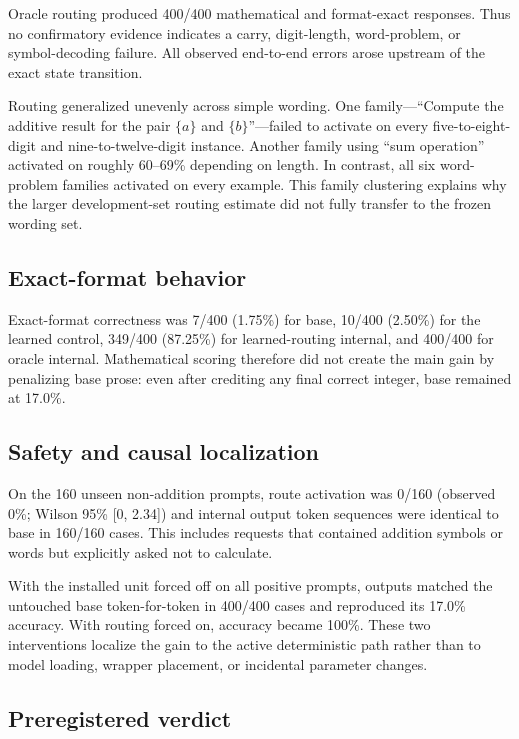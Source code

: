\documentclass[11pt]{article}
\begin{document}
Oracle routing produced 400/400 mathematical and format-exact responses.
Thus no confirmatory evidence indicates a carry, digit-length, word-problem,
or symbol-decoding failure. All observed end-to-end errors arose upstream of
the exact state transition.

Routing generalized unevenly across simple wording. One family---``Compute
the additive result for the pair \(\{a\}\) and \(\{b\}\)''---failed to activate
on every five-to-eight-digit and nine-to-twelve-digit instance. Another family
using ``sum operation'' activated on roughly 60--69\% depending on length.
In contrast, all six word-problem families activated on every example. This
family clustering explains why the larger development-set routing estimate
did not fully transfer to the frozen wording set.

\subsection{Exact-format behavior}

Exact-format correctness was 7/400 (1.75\%) for base, 10/400 (2.50\%) for the
learned control, 349/400 (87.25\%) for learned-routing internal, and 400/400
for oracle internal. Mathematical scoring therefore did not create the main
gain by penalizing base prose: even after crediting any final correct integer,
base remained at 17.0\%.

\subsection{Safety and causal localization}

On the 160 unseen non-addition prompts, route activation was 0/160 (observed
0\%; Wilson 95\% [0, 2.34]) and internal output token sequences were identical
to base in 160/160 cases. This includes requests that contained addition
symbols or words but explicitly asked not to calculate.

With the installed unit forced off on all positive prompts, outputs matched
the untouched base token-for-token in 400/400 cases and reproduced its 17.0\%
accuracy. With routing forced on, accuracy became 100\%. These two
interventions localize the gain to the active deterministic path rather than
to model loading, wrapper placement, or incidental parameter changes.

\subsection{Preregistered verdict}
\end{document}
